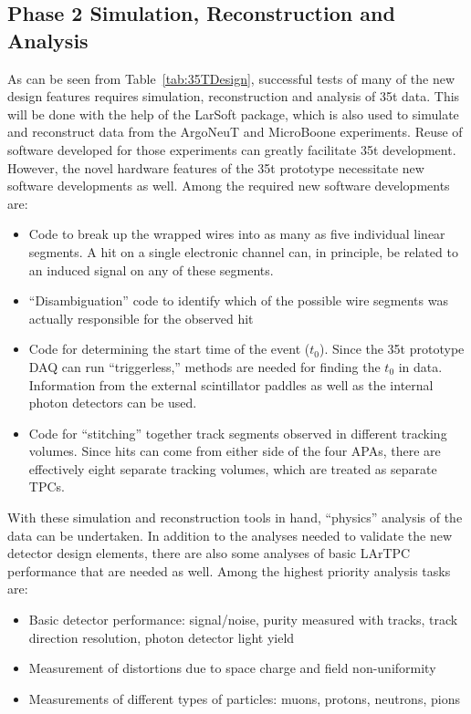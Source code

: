 \subsection{Phase 2 Simulation, Reconstruction and Analysis}
As can be seen from Table~\ref{tab:35TDesign}, successful tests of many of the new 
design features requires simulation, reconstruction and analysis of 35t data. 
This will be done with the help of the LarSoft package, which is also used to simulate and 
reconstruct data from the ArgoNeuT and MicroBoone experiments.
Reuse of software developed for those experiments can greatly facilitate 35t development. 
However, the novel hardware features of the 35t prototype necessitate new software developments 
as well.  
Among the required new software developments are:
\begin{itemize}
\item{Code to break up the wrapped wires into as many as five individual linear segments. 
A hit on a single electronic channel can, in principle, be related to an induced signal on any of these segments.}
\item{``Disambiguation'' code to identify which of the possible wire segments was actually responsible
for the observed hit}
\item{Code for determining the start time of the event ($t_0$). Since the 35t prototype DAQ can
run ``triggerless,'' methods are needed for finding the $t_0$ in data. Information from the external 
scintillator paddles as well as the internal photon detectors can be used.}
\item{Code for ``stitching'' together track segments observed in different tracking volumes. 
Since hits can come from either side of the four APAs, there are effectively eight separate tracking volumes, 
which are treated as separate TPCs.}
\end{itemize}

With these simulation and reconstruction tools in hand, ``physics'' analysis of the data can be undertaken.
In addition to the analyses needed to validate the new detector design elements, there are also
some analyses of basic LArTPC performance that are needed as well.
Among the highest priority analysis tasks are:

\begin{itemize}
\item{Basic detector performance: signal/noise, purity measured with tracks, track direction resolution, 
photon detector light yield}
\item{Measurement of distortions due to space charge and field non-uniformity}
\item{Measurements of different types of particles: muons, protons, neutrons, pions}
\end{itemize}

